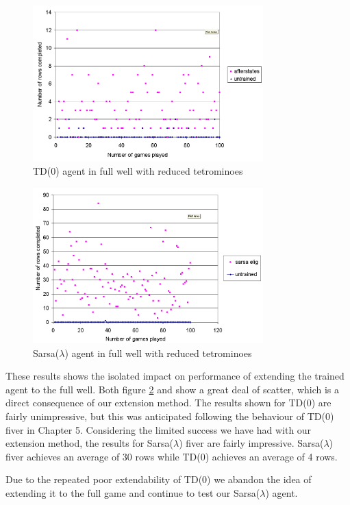 \documentclass{rucsthesis}
\begin{document}
\begin{figure}[h]
\centering
\includegraphics[width=3.5in]{afterstatesredtetfullwell.png}
\caption{TD(0) agent in full well with reduced tetrominoes}
\label{fig:afterstatesredtetfullwell}
\end{figure}

\begin{figure}[h]
\centering
\includegraphics[width=3.5in]{sarsaeligredtetfullwell.png}
\caption{Sarsa($\lambda$) agent in full well with reduced tetrominoes}
\label{fig:sarsaeligredtetfullwell}
\end{figure}

These results shows the isolated impact on performance of extending the trained agent to the full well. Both figure \ref{fig:sarsaeligredtetfullwell} and \label{fig:afterstatesredtetfullwell} show a great deal of scatter, which is a direct consequence of our extension method. The results shown for TD(0) are fairly unimpressive, but this was anticipated following the behaviour of TD(0) fiver in Chapter 5. Considering the limited success we have had with our extension method, the results for Sarsa($\lambda$) fiver are fairly impressive.  Sarsa($\lambda$) fiver achieves an average of 30 rows while TD(0) achieves an average of 4 rows.

Due to the repeated poor extendability of TD(0) we abandon the idea of extending it to the full game and continue to test our Sarsa($\lambda$) agent.
\end{document}
